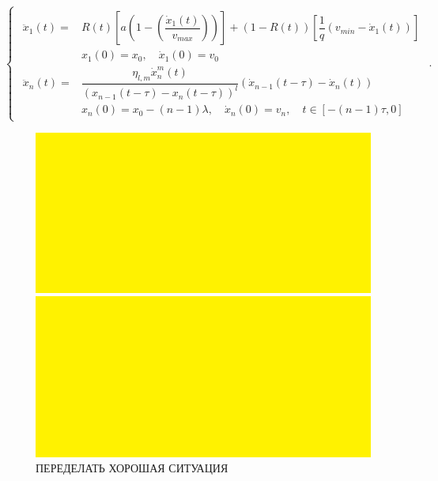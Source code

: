 \documentclass[12pt, a4paper]{extarticle}
\numberwithin{equation}{section}
\begin{document}
\begin{equation} \label{}
\begin{cases}
\begin{split}
\ddot{x}_{1}(t) = &R(t) \left[ a\left( 1-\left( \dfrac{\dot{x}_{1}(t)}{v_{max}}\right) \right)\right] + (1-R(t))\left[  \dfrac{1}{q}\left( v_{min} - \dot{x}_{1}(t)\right) \right]  \\
&x_{1}(0)=x_0, \quad \dot{x}_{1}(0)=v_{0}\\
\ddot{x}_n(t) = & \dfrac{\eta_{l,m}\dot{x}_n^m(t)}{(x_{n-1}(t-\tau)-x_n(t-\tau))^l}(\dot{x}_{n-1}(t-\tau)-\dot{x}_{n}(t)) \\
&x_n(0)=x_0-(n-1)\lambda, \quad \dot{x}_n(0)=v_{n}, \quad t \in [-(n-1)\tau,0]
\end{split}
\end{cases}.
\end{equation}

\begin{figure}[h!]
	\begin{center}
		\begin{minipage}[h!]{0.48\linewidth}
			\includegraphics[width=1\linewidth,height=0.2\textheight]
			{Images/test.png}
		\end{minipage}
		\hfill 
		\begin{minipage}[h!]{0.48\linewidth}
			\includegraphics[width=1\linewidth,height=0.2\textheight]
			{Images/test.png}
		\end{minipage}
		\caption{ПЕРЕДЕЛАТЬ ХОРОШАЯ СИТУАЦИЯ}
		\label{gazis_model_img}
	\end{center}
\end{figure}
\end{document}
